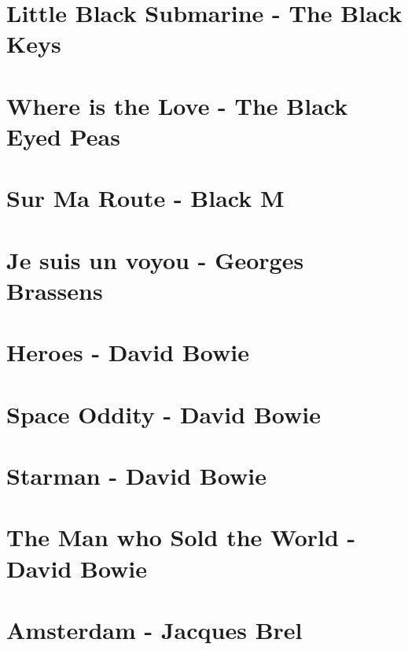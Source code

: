 \documentclass[11pt]{article}
\begin{document}
\section{Little Black Submarine - The Black Keys}
\begin{guitar}

\end{guitar}



\section{Where is the Love - The Black Eyed Peas}



\section{Sur Ma Route - Black M}
\begin{guitar}

\end{guitar}

\section{Je suis un voyou - Georges Brassens}
\begin{guitar}

\end{guitar}


\section{Heroes - David Bowie}


\section*{Space Oddity - David Bowie}
\section*{Starman - David Bowie}


\section*{The Man who Sold the World - David Bowie}



\section{Amsterdam - Jacques Brel}

\end{document}
